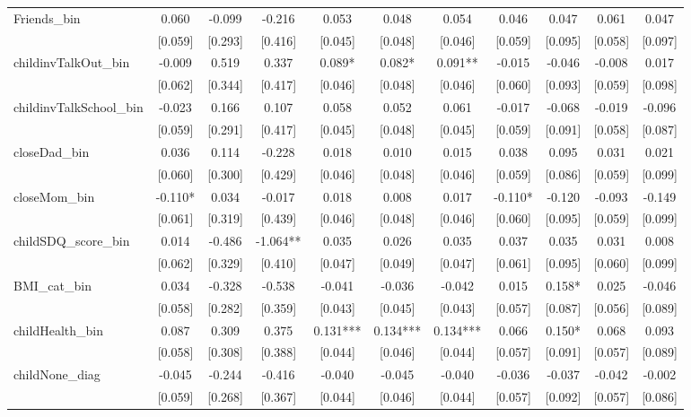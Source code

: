 \documentclass[12pt]{article}
\begin{document}
\begin{table}[ht]
\begin{center}
\begin{adjustbox}{width=1.2\textwidth,center=\textwidth}
\begin{tabular}{l*{10}{c}}
Friends\_bin & 0.060 & -0.099 & -0.216 & 0.053 & 0.048 & 0.054 & 0.046 & 0.047 & 0.061 & 0.047 \\
 & [0.059] & [0.293] & [0.416] & [0.045] & [0.048] & [0.046] & [0.059] & [0.095] & [0.058] & [0.097] \\
childinvTalkOut\_bin & -0.009 & 0.519 & 0.337 & 0.089* & 0.082* & 0.091** & -0.015 & -0.046 & -0.008 & 0.017 \\
 & [0.062] & [0.344] & [0.417] & [0.046] & [0.048] & [0.046] & [0.060] & [0.093] & [0.059] & [0.098] \\
childinvTalkSchool\_bin & -0.023 & 0.166 & 0.107 & 0.058 & 0.052 & 0.061 & -0.017 & -0.068 & -0.019 & -0.096 \\
 & [0.059] & [0.291] & [0.417] & [0.045] & [0.048] & [0.045] & [0.059] & [0.091] & [0.058] & [0.087] \\
closeDad\_bin & 0.036 & 0.114 & -0.228 & 0.018 & 0.010 & 0.015 & 0.038 & 0.095 & 0.031 & 0.021 \\
 & [0.060] & [0.300] & [0.429] & [0.046] & [0.048] & [0.046] & [0.059] & [0.086] & [0.059] & [0.099] \\
closeMom\_bin & -0.110* & 0.034 & -0.017 & 0.018 & 0.008 & 0.017 & -0.110* & -0.120 & -0.093 & -0.149 \\
 & [0.061] & [0.319] & [0.439] & [0.046] & [0.048] & [0.046] & [0.060] & [0.095] & [0.059] & [0.099] \\
childSDQ\_score\_bin & 0.014 & -0.486 & -1.064** & 0.035 & 0.026 & 0.035 & 0.037 & 0.035 & 0.031 & 0.008 \\
 & [0.062] & [0.329] & [0.410] & [0.047] & [0.049] & [0.047] & [0.061] & [0.095] & [0.060] & [0.099] \\
BMI\_cat\_bin & 0.034 & -0.328 & -0.538 & -0.041 & -0.036 & -0.042 & 0.015 & 0.158* & 0.025 & -0.046 \\
 & [0.058] & [0.282] & [0.359] & [0.043] & [0.045] & [0.043] & [0.057] & [0.087] & [0.056] & [0.089] \\
childHealth\_bin & 0.087 & 0.309 & 0.375 & 0.131*** & 0.134*** & 0.134*** & 0.066 & 0.150* & 0.068 & 0.093 \\
 & [0.058] & [0.308] & [0.388] & [0.044] & [0.046] & [0.044] & [0.057] & [0.091] & [0.057] & [0.089] \\
childNone\_diag & -0.045 & -0.244 & -0.416 & -0.040 & -0.045 & -0.040 & -0.036 & -0.037 & -0.042 & -0.002 \\
 & [0.059] & [0.268] & [0.367] & [0.044] & [0.046] & [0.044] & [0.057] & [0.092] & [0.057] & [0.086] \\

\end{tabular}
\end{adjustbox}
\end{center}
\end{table}
\end{document}
